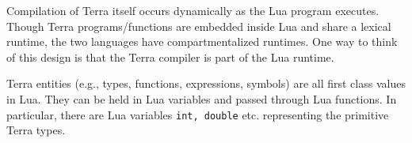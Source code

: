 \item Compilation of Terra itself occurs dynamically as the Lua program executes. Though Terra programs/functions are embedded inside Lua and share a lexical runtime, the two languages have compartmentalized runtimes. One way to think of this design is that the Terra compiler
is part of the Lua runtime.

\item Terra entities (e.g., types, functions, expressions, symbols) are all first class values in Lua.
They can be held in Lua variables and passed through Lua functions. In particular, there are Lua variables {\tt int, double} etc. representing the primitive Terra types.

\ee

  \ee

